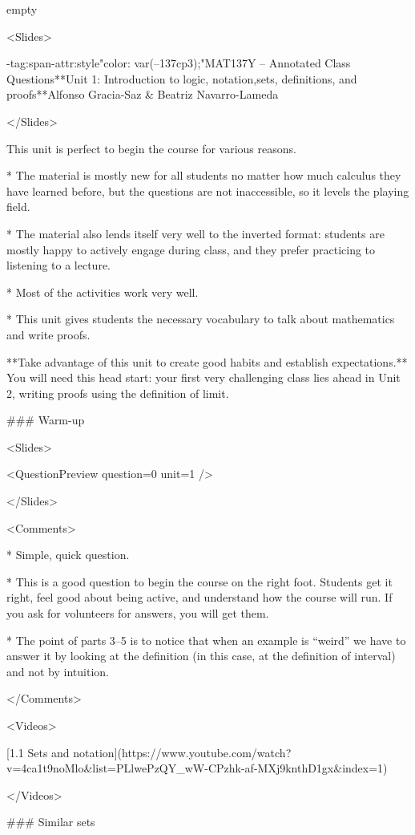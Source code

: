 empty

<Slides>

\html-tag:span{\html-attr:style{"color: var(--137cp3);"}MAT137Y – Annotated Class Questions}**Unit 1: Introduction to logic, notation,sets, definitions, and proofs**Alfonso Gracia-Saz & Beatriz Navarro-Lameda

</Slides>

This unit is perfect to begin the course for various reasons.

*   The material is mostly new for all students no matter how much calculus they have learned before, but the questions are not inaccessible, so it levels the playing field.

*   The material also lends itself very well to the inverted format: students are mostly happy to actively engage during class, and they prefer practicing to listening to a lecture.

*   Most of the activities work very well.

*   This unit gives students the necessary vocabulary to talk about mathematics and write proofs.

**Take advantage of this unit to create good habits and establish expectations.** You will need this head start: your first very challenging class lies ahead in Unit 2, writing proofs using the definition of limit.

### Warm-up

<Slides>

<QuestionPreview question={0} unit={1} />

</Slides>

<Comments>

*   Simple, quick question.

*   This is a good question to begin the course on the right foot. Students get it right, feel good about being active, and understand how the course will run. If you ask for volunteers for answers, you will get them.

*   The point of parts 3–5 is to notice that when an example is “weird” we have to answer it by looking at the definition (in this case, at the definition of interval) and not by intuition.

</Comments>

<Videos>

[1.1 Sets and notation](https://www.youtube.com/watch?v=4ca1t9noMlo\&list=PLlwePzQY_wW-CPzhk-af-MXj9knthD1gx\&index=1)

</Videos>

### Similar sets

